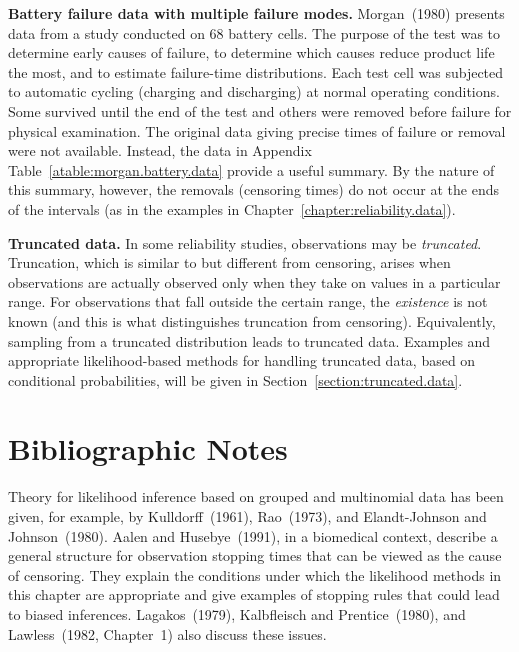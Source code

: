 \begin{example}
\label{example:morgan.battery.data}
{\bf Battery failure data with multiple failure modes.} Morgan~(1980)
presents data from a study conducted on 68 battery cells. The purpose
of the test was to determine early causes of failure, to determine
which causes reduce product life the most, and to estimate
failure-time distributions.  Each test cell was subjected to automatic
cycling (charging and discharging) at normal operating conditions.
Some survived until the end of the test and others were removed before
failure for physical examination. The original data giving precise
times of failure or removal were not available.  Instead, the data in
Appendix Table~\ref{atable:morgan.battery.data} provide a useful
summary. By the nature of this summary, however, the removals
(censoring times) do not occur at the ends of the intervals (as in the
examples in Chapter~\ref{chapter:reliability.data}).
\end{example}

\noindent
{\bf Truncated data.} In some reliability studies, observations may be
{\em truncated}.  Truncation, which is similar to but different from
censoring, arises when observations are actually observed only when
they take on values in a particular range. For observations that fall
outside the certain range, the {\em existence} is not known (and
this is what distinguishes truncation from censoring).  Equivalently,
sampling from a truncated distribution leads to truncated data.
Examples and appropriate likelihood-based methods for handling
truncated data, based on conditional probabilities, will be given in
Section~\ref{section:truncated.data}.



\section*{Bibliographic Notes}
Theory for likelihood inference based on grouped and multinomial data
has been given, for example, by Kulldorff~(1961), Rao~(1973), and
Elandt-Johnson and Johnson~(1980).  Aalen and Husebye~(1991), in a biomedical
context, describe a general structure for 
observation stopping times that can be
viewed as the cause of censoring. They explain the conditions under
which the likelihood methods in this chapter are appropriate and give
examples of stopping rules that could lead to biased inferences.
Lagakos~(1979), Kalbfleisch and Prentice~(1980), and Lawless~(1982,
Chapter~1) also discuss these issues.



